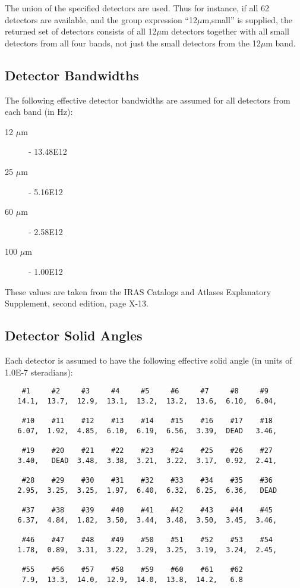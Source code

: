 The union of the specified detectors are used. Thus for instance,
if all 62 detectors are available, and the group expression
``12$\mu$m,small'' is supplied, the returned set of detectors consists
of all 12$\mu$m detectors together with all small detectors from all
four bands, not just the small detectors from the 12$\mu$m band. 

\subsection{Detector Bandwidths}
\label{SEC:BWID}
The following effective detector bandwidths are assumed for 
all detectors from each band (in Hz):
\begin{description}
\item [12 $\mu$m] - 13.48E12    
\item [25 $\mu$m] - 5.16E12    
\item [60 $\mu$m] - 2.58E12    
\item [100 $\mu$m] - 1.00E12
\end{description}

These values are taken from the {\small IRAS} Catalogs and Atlases 
Explanatory Supplement, second edition, page X-13.

\subsection{Detector Solid Angles}
\label{SEC:SOLAN}
Each detector is assumed to have the following effective solid 
angle (in units of 1.0E-7 steradians):

\small
\begin{verbatim}
    #1     #2     #3     #4     #5     #6     #7     #8     #9
   14.1,  13.7,  12.9,  13.1,  13.2,  13.2,  13.6,  6.10,  6.04,  

    #10    #11    #12    #13    #14    #15    #16    #17    #18
   6.07,  1.92,  4.85,  6.10,  6.19,  6.56,  3.39,  DEAD   3.46,  

    #19    #20    #21    #22    #23    #24    #25    #26    #27
   3.40,   DEAD  3.48,  3.38,  3.21,  3.22,  3.17,  0.92,  2.41,  

    #28    #29    #30    #31    #32    #33    #34    #35    #36
   2.95,  3.25,  3.25,  1.97,  6.40,  6.32,  6.25,  6.36,   DEAD  

    #37    #38    #39    #40    #41    #42    #43    #44    #45
   6.37,  4.84,  1.82,  3.50,  3.44,  3.48,  3.50,  3.45,  3.46,  

    #46    #47    #48    #49    #50    #51    #52    #53    #54
   1.78,  0.89,  3.31,  3.22,  3.29,  3.25,  3.19,  3.24,  2.45,

    #55    #56    #57    #58    #59    #60    #61    #62
    7.9,  13.3,  14.0,  12.9,  14.0,  13.8,  14.2,   6.8
\end{verbatim}
\normalsize

